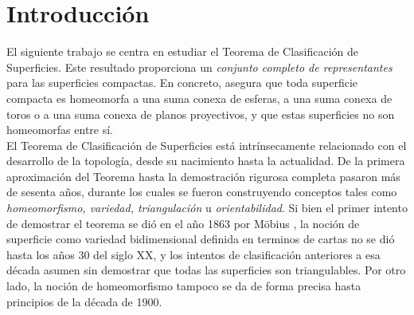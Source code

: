 \documentclass[10pt]{report}
\theoremstyle{definition}
\begin{document}
\section*{Introducción}
El siguiente trabajo se centra en estudiar el Teorema de Clasificación de Superficies. Este resultado proporciona un \textit{conjunto completo de representantes} para las superficies compactas. En concreto, asegura que toda superficie compacta es homeomorfa a una suma conexa de esferas, a una suma conexa de toros o a una suma conexa de planos proyectivos, y que estas superficies no son homeomorfas entre sí.\\

El Teorema de Clasificación de Superficies está intrínsecamente relacionado con el desarrollo de la topología, desde su nacimiento hasta la actualidad. De la primera aproximación del Teorema hasta la demostración rigurosa completa pasaron más de sesenta años, durante los cuales se fueron construyendo conceptos tales como \textit{homeomorfismo, variedad, triangulación} u \textit{orientabilidad}. Si bien el primer intento de demostrar el teorema se dió en el año 1863 por Möbius \cite{mobius}, la noción de superficie como variedad bidimensional definida en terminos de cartas no se dió hasta los años 30 del siglo XX, y los intentos de clasificación anteriores a esa década asumen sin demostrar que todas las superficies son triangulables. Por otro lado, la noción de homeomorfismo tampoco se da de forma precisa hasta principios de la década de 1900.\\
\end{document}

